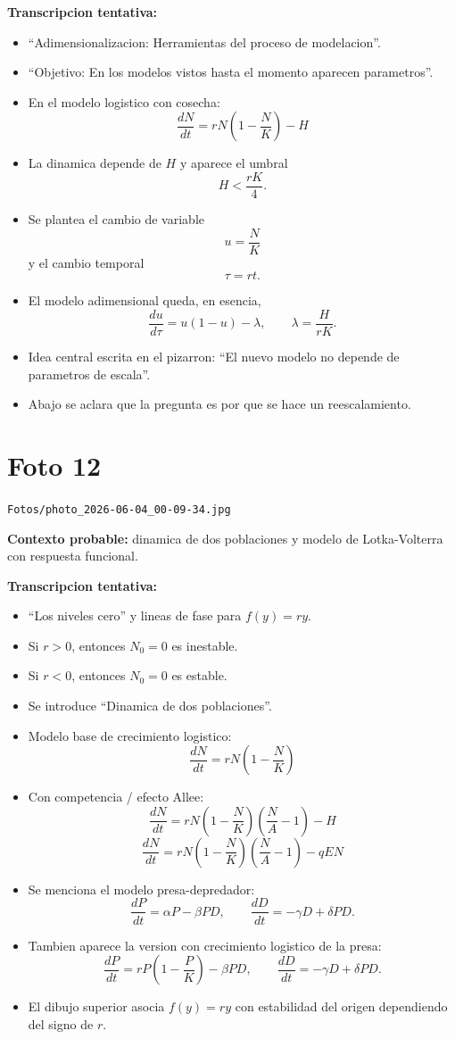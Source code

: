 \documentclass[11pt,letterpaper]{article}
\begin{document}
\textbf{Transcripcion tentativa:}
\begin{itemize}[leftmargin=*]
    \item ``Adimensionalizacion: Herramientas del proceso de modelacion''.
    \item ``Objetivo: En los modelos vistos hasta el momento aparecen parametros''.
    \item En el modelo logistico con cosecha:
    \[
    \frac{dN}{dt}=rN\left(1-\frac{N}{K}\right)-H
    \]
    \item La dinamica depende de \(H\) y aparece el umbral
    \[
    H<\frac{rK}{4}.
    \]
    \item Se plantea el cambio de variable
    \[
    u=\frac{N}{K}
    \]
    y el cambio temporal
    \[
    \tau=rt.
    \]
    \item El modelo adimensional queda, en esencia,
    \[
    \frac{du}{d\tau}=u(1-u)-\lambda,
    \qquad \lambda=\frac{H}{rK}.
    \]
    \item Idea central escrita en el pizarron: ``El nuevo modelo no depende de parametros de escala''.
    \item Abajo se aclara que la pregunta es por que se hace un reescalamiento.
\end{itemize}

\section*{Foto 12}
\texttt{Fotos/photo\_2026-06-04\_00-09-34.jpg}

\textbf{Contexto probable:} dinamica de dos poblaciones y modelo de Lotka-Volterra con respuesta funcional.

\textbf{Transcripcion tentativa:}
\begin{itemize}[leftmargin=*]
    \item ``Los niveles cero'' y lineas de fase para \(f(y)=ry\).
    \item Si \(r>0\), entonces \(N_0=0\) es inestable.
    \item Si \(r<0\), entonces \(N_0=0\) es estable.
    \item Se introduce ``Dinamica de dos poblaciones''.
    \item Modelo base de crecimiento logistico:
    \[
    \frac{dN}{dt}=rN\left(1-\frac{N}{K}\right)
    \]
    \item Con competencia / efecto Allee:
    \[
    \frac{dN}{dt}=rN\left(1-\frac{N}{K}\right)\left(\frac{N}{A}-1\right)-H
    \]
    \[
    \frac{dN}{dt}=rN\left(1-\frac{N}{K}\right)\left(\frac{N}{A}-1\right)-qEN
    \]
    \item Se menciona el modelo presa-depredador:
    \[
    \frac{dP}{dt}=\alpha P-\beta PD,
    \qquad
    \frac{dD}{dt}=-\gamma D+\delta PD.
    \]
    \item Tambien aparece la version con crecimiento logistico de la presa:
    \[
    \frac{dP}{dt}=rP\left(1-\frac{P}{K}\right)-\beta PD,
    \qquad
    \frac{dD}{dt}=-\gamma D+\delta PD.
    \]
    \item El dibujo superior asocia \(f(y)=ry\) con estabilidad del origen dependiendo del signo de \(r\).
\end{itemize}
\end{document}
